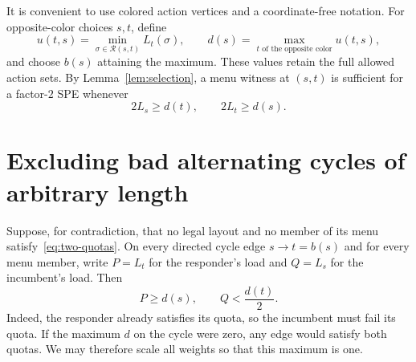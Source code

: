 \documentclass[11pt]{article}
\theoremstyle{definition}
\theoremstyle{remark}
\newcommand{\Rmenu}{\mathcal R}
\begin{document}
It is convenient to use colored action vertices and a coordinate-free notation. For opposite-color choices $s,t$, define
\[
 u(t,s)=\min_{\sigma\in\Rmenu(s,t)}L_t(\sigma),\qquad
 d(s)=\max_{t\text{ of the opposite color}}u(t,s),
\]
and choose $b(s)$ attaining the maximum. These values retain the full allowed action sets. By Lemma~\ref{lem:selection}, a menu witness at $(s,t)$ is sufficient for a factor-$2$ SPE whenever
\begin{equation}\label{eq:two-quotas}
 2L_s\ge d(t),\qquad 2L_t\ge d(s).
\end{equation}

\section{Excluding bad alternating cycles of arbitrary length}\label{sec:fourcycle}

Suppose, for contradiction, that no legal layout and no member of its menu satisfy~\eqref{eq:two-quotas}. On every directed cycle edge $s\to t=b(s)$ and for every menu member, write $P=L_t$ for the responder's load and $Q=L_s$ for the incumbent's load. Then
\begin{equation}\label{eq:badedge}
 P\ge d(s),\qquad Q<\frac{d(t)}2.
\end{equation}
Indeed, the responder already satisfies its quota, so the incumbent must fail its quota. If the maximum $d$ on the cycle were zero, any edge would satisfy both quotas. We may therefore scale all weights so that this maximum is one.
\end{document}
